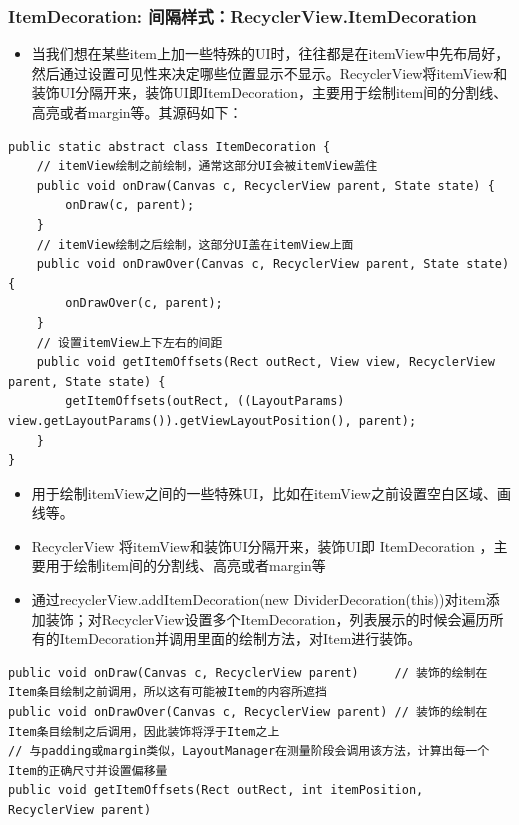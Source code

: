 \documentclass[9pt, b5paper]{article}
\begin{document}
\subsubsection{ItemDecoration: 间隔样式：RecyclerView.ItemDecoration}
\label{sec-5-3-4}
\begin{itemize}
\item 当我们想在某些item上加一些特殊的UI时，往往都是在itemView中先布局好，然后通过设置可见性来决定哪些位置显示不显示。RecyclerView将itemView和装饰UI分隔开来，装饰UI即ItemDecoration，主要用于绘制item间的分割线、高亮或者margin等。其源码如下：
\end{itemize}
\begin{verbatim}
public static abstract class ItemDecoration {
    // itemView绘制之前绘制，通常这部分UI会被itemView盖住
    public void onDraw(Canvas c, RecyclerView parent, State state) {
        onDraw(c, parent);
    }
    // itemView绘制之后绘制，这部分UI盖在itemView上面
    public void onDrawOver(Canvas c, RecyclerView parent, State state) {
        onDrawOver(c, parent);
    }
    // 设置itemView上下左右的间距
    public void getItemOffsets(Rect outRect, View view, RecyclerView parent, State state) {
        getItemOffsets(outRect, ((LayoutParams) view.getLayoutParams()).getViewLayoutPosition(), parent);
    }
}
\end{verbatim}
\begin{itemize}
\item 用于绘制itemView之间的一些特殊UI，比如在itemView之前设置空白区域、画线等。
\item RecyclerView 将itemView和装饰UI分隔开来，装饰UI即 ItemDecoration ，主要用于绘制item间的分割线、高亮或者margin等
\item 通过recyclerView.addItemDecoration(new DividerDecoration(this))对item添加装饰；对RecyclerView设置多个ItemDecoration，列表展示的时候会遍历所有的ItemDecoration并调用里面的绘制方法，对Item进行装饰。
\end{itemize}
\begin{verbatim}
public void onDraw(Canvas c, RecyclerView parent)     // 装饰的绘制在Item条目绘制之前调用，所以这有可能被Item的内容所遮挡
public void onDrawOver(Canvas c, RecyclerView parent) // 装饰的绘制在Item条目绘制之后调用，因此装饰将浮于Item之上
// 与padding或margin类似，LayoutManager在测量阶段会调用该方法，计算出每一个Item的正确尺寸并设置偏移量
public void getItemOffsets(Rect outRect, int itemPosition, RecyclerView parent)
\end{verbatim}
\end{document}
